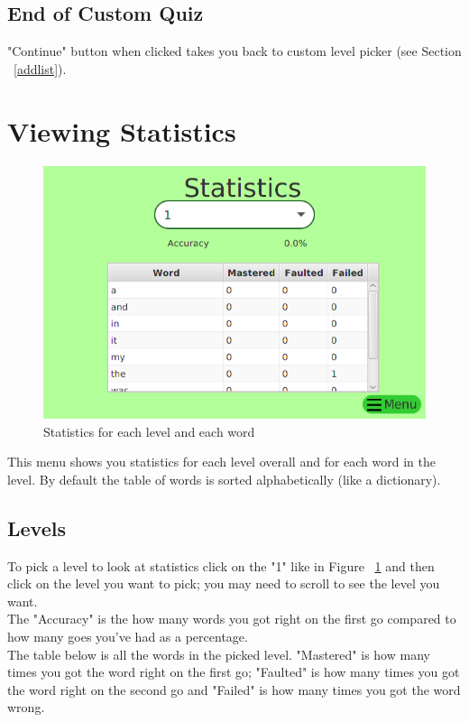 \documentclass[12pt,a4paper,titlepage,onecolumn]{article}
\begin{document}
		\subsection{End of Custom Quiz}
		"Continue" button when clicked takes you back to custom level picker (see Section ~\ref{addlist}).
		
	\section{Viewing Statistics}
	\begin{figure}[h]
	\centering
	\includegraphics[width=1\linewidth]{Figures/Statistics/StatisticsGeneral}
	\caption[Statistics Menu]{Statistics for each level and each word}
	\label{fig:StatisticsGeneral}
	\end{figure}
	This menu shows you statistics for each level overall and for each word in the level. By default the table of words is sorted alphabetically (like a dictionary).
		\subsection{Levels}
		To pick a level to look at statistics click on the "1" like in Figure ~\ref{fig:StatisticsGeneral} and then click on the level you want to pick; you may need to scroll to see the level you want.\\ The "Accuracy" is the how many words you got right on the first go compared to how many goes you've had as a percentage. \\The table below is all the words in the picked level. "Mastered" is how many times you got the word right on the first go; "Faulted" is how many times you got the word right on the second go and "Failed" is how many times you got the word wrong.
\end{document}
